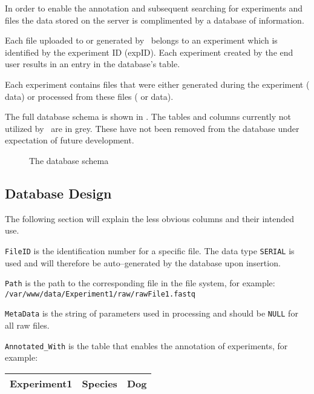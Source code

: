 In order to enable the annotation and subsequent searching for experiments and files the data stored on the server is complimented by a database of information.

Each file uploaded to or generated by \appName\ belongs to an experiment which is identified by the experiment ID (expID). Each experiment created by the end user results in an entry in the database's  table.

Each experiment contains files that were either generated during the experiment ( data) or processed from these files ( or  data).

The full database schema is shown in . The tables and columns currently not utilized by \appName\ are in grey. These have not been removed from the database under expectation of future development.

\begin{figure}[p]
\caption{The database schema}
\label{fig:dat_databaseSchema}
\end{figure}

\FloatBarrier

\subsection{Database Design}
The following section will explain the less obvious columns and their intended use.

\texttt{FileID} is the identification number for a specific file. The data type \texttt{SERIAL} is used and will therefore be auto--generated by the database upon insertion.

\texttt{Path} is the path to the corresponding file in the file system, for example:
\texttt{/var/www/data/Experiment1/raw/rawFile1.fastq}

\texttt{MetaData} is the string of parameters used in processing and should be \texttt{NULL} for all raw files.

\texttt{Annotated\_With} is the table that enables the annotation of experiments, for example:
\begin{center}
  \begin{tabular}{| l | l | l |}
    \hline
    Experiment1 & Species & Dog \\
    \hline
  \end{tabular}
\end{center}

